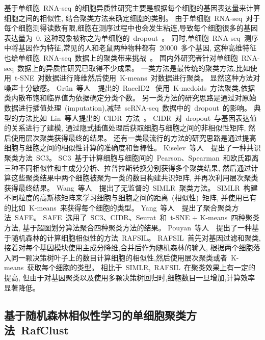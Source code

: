 基于单细胞~RNA-seq~的细胞异质性研究主要是根据每个细胞的基因表达量来计算细胞之间的相似性,
结合聚类方法来确定细胞的类别。
由于单细胞~RNA-seq~对于每个细胞测得读数有限,细胞在测序过程中也会发生粘连,导致每个细胞很多的基因表达量为~0,
这种现象被称之为单细胞的~dropout~\cite{vallejos2017normalizing}。
同时,单细胞~RNA-seq~测序中将基因作为特征,常见的人和老鼠两种物种都有~20000~多个基因,
这种高维特征也给单细胞~RNA-seq~数据上的聚类带来挑战~\cite{stegle2015computational}。
国内外研究者针对单细胞~RNA-seq~数据上的异质性研究已取得不少成果。
一类方法是最传统的聚类方法,比如使用~t-SNE~对数据进行降维然后使用~K-means~对数据进行聚类。
显然这种方法对噪声十分敏感。
Gr{\"u}n~等人~\cite{grun2016novo}~提出的~RaceID2~
使用~K-medoids~方法聚类,依据类内散布饱和临界值为依据确定分类个数。
另一类方法的研究思路是通过对原始数据进行插值处理~(imputation),减轻~scRNA-seq~数据中的~dropout~的影响。
典型的方法比如~Lin~等人提出的~CIDR~方法~\cite{lin2017cidr}。
CIDR~对~dropout~与基因表达值的关系进行了建模, 通过隐式插值处理后获取细胞与细胞之间的非相似性矩阵,
然后使用层次聚类获得最终的结果。
还有一类最流行的方法的研究思路是通过提高细胞与细胞之间的相似性计算的准确度和鲁棒性。
Kiselev~等人~\cite{kiselev2017sc3}~提出了一种共识聚类方法~SC3。
SC3~基于计算细胞与细胞间的~Pearson、Spearman~和欧氏距离三种不同相似性和主成分分析、拉普拉斯转换分别获得多个聚类结果,
然后通过计算这些聚类结果中两个细胞被聚为一类的数目构建共识矩阵,
并再次利用层次聚类获得最终结果。
Wang~等人~\cite{wang2018simlr}~提出了无监督的~SIMLR~聚类方法。
SIMLR~构建不同粒度的高斯核矩阵来学习细胞与细胞之间的距离~(相似性)~矩阵,
并使用已有的比如~K-means~来获得每个细胞的类型。
Yang~等人~\cite{yang2018safe}~提出了聚合聚类方法~SAFE。
SAFE~选用了~SC3、CIDR、Seurat~和~t-SNE + K-means~四种聚类方法,
基于超图划分算法聚合四种聚类方法的结果。
Pouyan~等人~\cite{pouyan2018random}~提出了一种基于随机森林的计算细胞相似性的方法~RAFSIL。
RAFSIL~首先对基因过滤和聚类,接着对每个基因模块使用主成分降维,合并后作为随机森林的输入,
根据两个细胞落入同一颗决策树叶子上的数目计算细胞的相似性,然后使用层次聚类或者~K-means~获取每个细胞的类型。
相比于~SIMLR,~RAFSIL~在聚类效果上有一定的提高,
但由于对基因聚类以及使用多颗决策树回归时,细胞数目一旦增加,计算效率显著降低。

\subsection{基于随机森林相似性学习的单细胞聚类方法~RafClust}
\label{sec:method}

